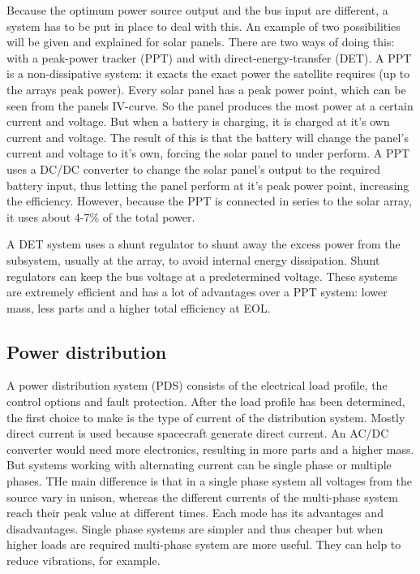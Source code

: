 Because the optimum power source output and the bus input are different, a system has to be put in place to deal with this. An example of two possibilities will be given and explained for solar panels.
There are two ways of doing this: with a peak-power tracker (PPT) and with direct-energy-transfer (DET). 
A PPT is a non-dissipative system: it exacts the exact power the satellite requires (up to the arrays peak power). Every solar panel has a peak power point, which can be seen from the panels IV-curve. So the panel produces the most power at a certain current and voltage. But when a battery is charging, it is charged at it's own current and voltage. The result of this is that the battery will change the panel's current and voltage to it's own, forcing the solar panel to under perform. A PPT uses a DC/DC converter to change the solar panel's output to the required battery input, thus letting the panel perform at it's peak power point, increasing the efficiency. However, because the PPT is connected in series to the solar array, it uses about 4-7\% of the total power.

A DET system uses a shunt regulator to shunt away the excess power from the subsystem, usually at the array, to avoid internal energy dissipation. Shunt regulators can keep the bus voltage at a predetermined voltage. These systems are extremely efficient and has a lot of advantages over a PPT system: lower mass, less parts and a higher total efficiency at EOL.

\subsection{Power distribution}
\label{blDOdistribution}

A power distribution system (PDS) consists of the electrical load profile, the control options and fault protection.
After the load profile has been determined, the first choice to make is the type of current of the distribution system. Mostly direct current is used because spacecraft generate direct current. An AC/DC converter would need more electronics, resulting in more parts and a higher mass. 
But systems working with alternating current can be single phase or multiple phases\cite{kuphaldt}. THe main difference is that in a single phase system all voltages from the source vary in unison, whereas the different currents of the multi-phase system reach their peak value at different times. Each mode has its advantages and disadvantages. Single phase systems are simpler and thus cheaper but when higher loads are required multi-phase system are more useful. They can help to reduce vibrations, for example.

